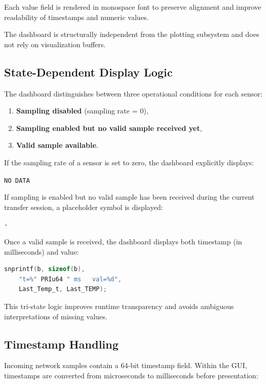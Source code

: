 Each value field is rendered in monospace font to preserve alignment and improve readability of timestamps and numeric values.

The dashboard is structurally independent from the plotting subsystem and does not rely on visualization buffers.

\subsection{State-Dependent Display Logic}
\label{sec:gui_dashboard_logic}

The dashboard distinguishes between three operational conditions for each sensor:

\begin{enumerate}
	\item \textbf{Sampling disabled} (sampling rate = 0),
	\item \textbf{Sampling enabled but no valid sample received yet},
	\item \textbf{Valid sample available}.
\end{enumerate}

If the sampling rate of a sensor is set to zero, the dashboard explicitly displays:

\begin{center}
	\texttt{NO DATA}
\end{center}

If sampling is enabled but no valid sample has been received during the current transfer session, a placeholder symbol is displayed:

\begin{center}
	\texttt{-}
\end{center}

Once a valid sample is received, the dashboard displays both timestamp (in milliseconds) and value:

\begin{lstlisting}[language=C]
	snprintf(b, sizeof(b),
	"t=%" PRIu64 " ms   val=%d",
	Last_Temp_t, Last_TEMP);
\end{lstlisting}

This tri-state logic improves runtime transparency and avoids ambiguous interpretations of missing values.

\subsection{Timestamp Handling}
\label{sec:gui_timestamp_handling}

Incoming network samples contain a 64-bit timestamp field. Within the GUI, timestamps are converted from microseconds to milliseconds before presentation:

